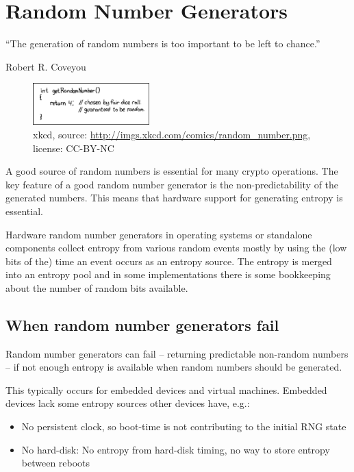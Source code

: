 \section{Random Number Generators}
\label{section:RNGs}


\epigraph{``The generation of random numbers is too important to be left to chance.''}{Robert R. Coveyou}


\begin{figure}[h]
  \centering
  \includegraphics[width=0.4\textwidth]{img/random_number.png}
  \caption{xkcd, source: \url{http://imgs.xkcd.com/comics/random_number.png}, license: CC-BY-NC}
  \label{fig:dilbertRNG}
\end{figure}



A good source of random numbers is essential for many crypto
operations. The key feature of a good random number generator is the
non-predictability of the generated numbers. This means that hardware
support for generating entropy is essential.


Hardware random number generators in operating systems or standalone
components collect entropy from various random events mostly by using
the (low bits of the) time an event occurs as an entropy source. The
entropy is merged into an entropy pool and in some implementations there
is some bookkeeping about the number of random bits available.

\subsection{When random number generators fail}

Random number generators can fail -- returning predictable non-random
numbers -- if not enough entropy is available when random numbers should
be generated.

This typically occurs for embedded devices and virtual machines.
Embedded devices lack some entropy sources other devices have, e.g.:

\begin{itemize}
\item No persistent clock, so boot-time is not contributing to the
    initial RNG state
\item No hard-disk: No entropy from hard-disk timing, no way to store
    entropy between reboots
\end{itemize}

